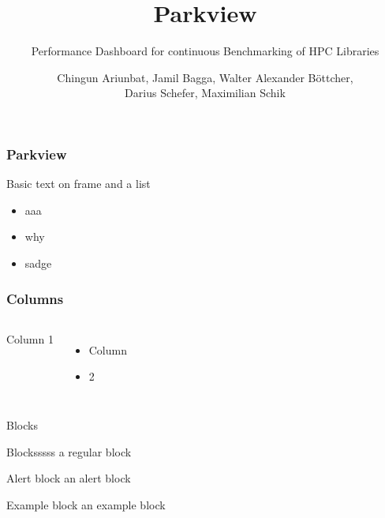 \documentclass{beamer}
\title{Parkview}
\subtitle{Performance Dashboard for continuous Benchmarking of HPC Libraries}
\author{Chingun Ariunbat, Jamil Bagga, Walter Alexander B\"ottcher,\\Darius Schefer, Maximilian Schik}
\begin{document}
\maketitle

\begin{frame}
	\frametitle{Parkview}
	Basic text on frame and a list

	\begin{itemize}
		\item{aaa}
                \item{why}
		\item{sadge}
	\end{itemize}
\end{frame}

\begin{frame}
	\frametitle{Columns}
	\begin{columns}

		Column 1

                \begin{itemize}
                    \item Column
                    \item 2
                \end{itemize}

	\end{columns}
\end{frame}

\begin{frame}{Blocks}

	\begin{block}{Blocksssss}
	        a regular block
	\end{block}

	\begin{alertblock}{Alert block}
		an alert block
	\end{alertblock}

	\begin{exampleblock}{Example block}
		an example block
	\end{exampleblock}
\end{frame}
\end{document}
